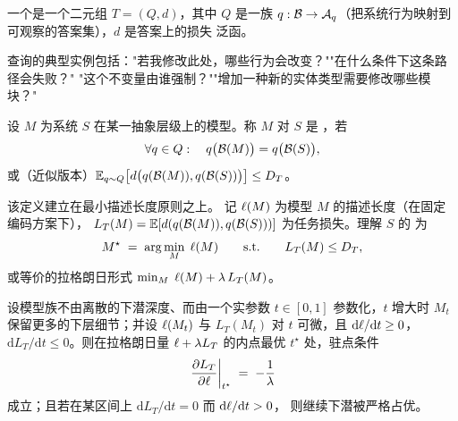 \begin{definition}[任务]\label{def:task}
一个是一个二元组 $T = (Q, d)$，其中 $Q$ 是一族
$q : \mathcal{B} \to \mathcal{A}_q$（把系统行为映射到可观察的答案集），$d$ 是答案上的损失
泛函。
\end{definition}

查询的典型实例包括："若我修改此处，哪些行为会改变？""在什么条件下这条路径会失败？"
"这个不变量由谁强制？""增加一种新的实体类型需要修改哪些模块？"

\begin{definition}[$T$-充分性]\label{def:sufficient}
设 $M$ 为系统 $S$ 在某一抽象层级上的模型。称 $M$ 对 $S$ 是 ，若
\begin{equation}\label{eq:sufficient}
\forall q \in Q:\quad q\bigl(\mathcal{B}(M)\bigr) = q\bigl(\mathcal{B}(S)\bigr),
\end{equation}
或（近似版本）$\mathbb{E}_{q \sim Q}\bigl[d\bigl(q(\mathcal{B}(M)), q(\mathcal{B}(S))\bigr)\bigr]
\le D_T$。
\end{definition}

\begin{definition}[描述长度与率失真目标]\label{def:mdl}
该定义建立在最小描述长度原则之上\cite{rissanen1978,grunwald2006,grunwald2019}。
记 $\ell(M)$ 为模型 $M$ 的描述长度（在固定编码方案下），
$L_T(M) = \mathbb{E}[d(q(\mathcal{B}(M)), q(\mathcal{B}(S)))]$ 为任务损失。理解 $S$ 的
为
\begin{equation}\label{eq:ratedistortion}
M^{\star} \;=\; \arg\min_{M} \; \ell(M)
\qquad \text{s.t.} \qquad L_T(M) \le D_T ,
\end{equation}
或等价的拉格朗日形式 $\min_M \; \ell(M) + \lambda\, L_T(M)$。
\end{definition}

\begin{proposition}[连续松弛下的下潜停止准则]\label{prop:stopping}
设模型族不由离散的下潜深度、而由一个实参数 $t \in [0,1]$ 参数化，$t$ 增大时 $M_t$
保留更多的下层细节；并设 $\ell(M_t)$ 与 $L_T(M_t)$ 对 $t$ 可微，且
$\mathrm{d}\ell/\mathrm{d}t \ge 0$，$\mathrm{d}L_T/\mathrm{d}t \le 0$。则在拉格朗日量
$\ell + \lambda L_T$ 的内点最优 $t^{\star}$ 处，驻点条件
\begin{equation}\label{eq:stopping}
\left.\frac{\partial L_T}{\partial \ell}\right|_{t^{\star}} \;=\; -\frac{1}{\lambda}
\end{equation}
成立；且若在某区间上 $\mathrm{d}L_T/\mathrm{d}t = 0$ 而 $\mathrm{d}\ell/\mathrm{d}t > 0$，
则继续下潜被严格占优。
\end{proposition}

